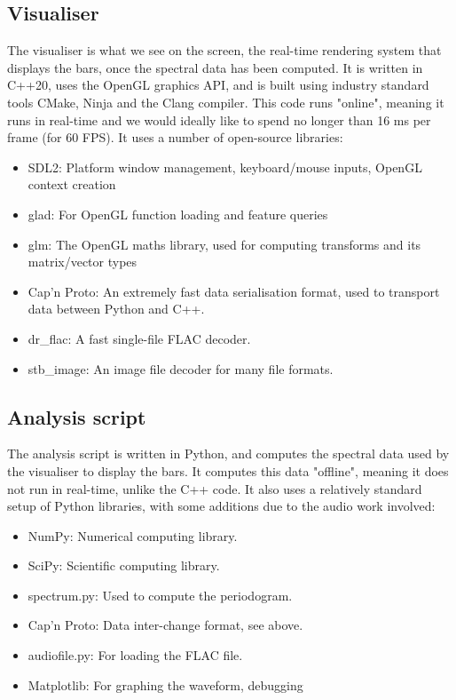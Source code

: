 \documentclass[11pt]{article}
\begin{document}
\subsection{Visualiser}
The visualiser is what we see on the screen, the real-time rendering system that displays the bars, once the
spectral data has been computed. It is written in C++20, uses the OpenGL graphics API, and is built using
industry standard tools CMake, Ninja and the Clang compiler. This code runs "online", meaning it runs in
real-time and we would ideally like to spend no longer than 16 ms per frame (for 60 FPS). It uses a number of
open-source libraries:
\begin{itemize}
	\item SDL2: Platform window management, keyboard/mouse inputs, OpenGL context creation
	\item glad: For OpenGL function loading and feature queries
    \item glm: The OpenGL maths library, used for computing transforms and its matrix/vector types
    \item Cap'n Proto: An extremely fast data serialisation format, used to transport data between Python and
        C++.
    \item dr\_flac: A fast single-file FLAC decoder.
    \item stb\_image: An image file decoder for many file formats.
\end{itemize}

\subsection{Analysis script}
The analysis script is written in Python, and computes the spectral data used by the visualiser to display the
bars. It computes this data "offline", meaning it does not run in real-time, unlike the C++ code. It also uses
a relatively standard setup of Python libraries, with some additions due to the audio work involved:
\begin{itemize}
    \item NumPy: Numerical computing library.
    \item SciPy: Scientific computing library.
    \item spectrum.py: Used to compute the periodogram.
    \item Cap'n Proto: Data inter-change format, see above.
    \item audiofile.py: For loading the FLAC file.
    \item Matplotlib: For graphing the waveform, debugging
\end{itemize}
\end{document}
